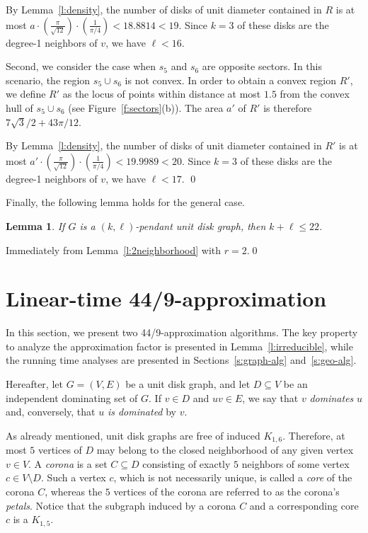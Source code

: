 \documentclass[preprint,12pt]{elsarticle}
\newtheorem{lem}[thm]{Lemma}
\begin{document}
\begin{pf}
By Lemma~\ref{l:density}, the number of disks of unit diameter contained in $R$ is at most $
a \cdot \left(\frac{\pi}{\sqrt{12}} \right) \cdot \left(\frac{1}{\pi/4}\right) < 18{.}8814 < 19.$
Since $k=3$ of these disks are the degree-1 neighbors of $v$, we have $\ell<16$.

Second, we consider the case when $s_5$ and $s_6$ are opposite sectors. In this scenario, the region $s_5 \cup s_6$ is not convex. In order to obtain a convex region $R'$, we define $R'$ as the locus of points within distance at most $1{.}5$ from the convex hull of $s_5 \cup s_6$ (see Figure~\ref{f:sectors}(b)). The area $a'$ of $R'$ is therefore $7\sqrt{3}/2 + 43\pi/12$.

By Lemma~\ref{l:density}, the number of disks of unit diameter contained in $R'$ is at most $a' \cdot \left(\frac{\pi}{\sqrt{12}} \right) \cdot \left(\frac{1}{\pi/4}\right) < 19{.}9989 < 20.$
Since $k=3$ of these disks are the degree-1 neighbors of $v$, we have $\ell<17$.
\qed
\end{pf}

Finally, the following lemma holds for the general case.

\begin{lem} \label{l:kl-pendant}
If $G$ is a $(k,\ell)$-pendant unit disk graph, then $k + \ell \leq 22$.
\end{lem}
\begin{pf}
Immediately from Lemma~\ref{l:2neighborhood} with $r=2$.\qed
\end{pf}


\section{Linear-time 44/9-approximation} \label{s:algorithm}

In this section, we present two 44/9-approximation algorithms. The key property to analyze the approximation factor is presented in Lemma~\ref{l:irreducible}, while the running time analyses are presented in Sections~\ref{s:graph-alg} and~\ref{s:geo-alg}.

Hereafter, let $G = (V,E)$ be a unit disk graph, and let $D \subseteq V$ be an independent dominating set of $G$. If $v \in D$ and $uv \in E$, we say that $v$ \emph{dominates} $u$ and, conversely, that $u$ \emph{is dominated} by $v$.

As already mentioned, unit disk graphs are free of induced $K_{1,6}$. Therefore, at most $5$ vertices of $D$ may belong to the closed neighborhood of any given vertex $v \in V$. A \emph{corona} is a set $C \subseteq D$ consisting of exactly $5$ neighbors of some vertex $c \in V \setminus D$. Such a vertex $c$, which is not necessarily unique, is called a \emph{core} of the corona $C$, whereas the $5$ vertices of the corona are referred to as the corona's \emph{petals}. Notice that the subgraph induced by a corona $C$ and a corresponding core $c$ is a $K_{1,5}$.
\end{document}
